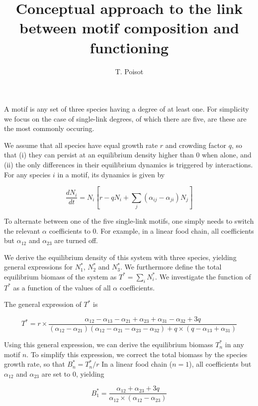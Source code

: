 \documentclass[11pt]{article}
\title{Conceptual approach to the link between motif composition and functioning}
\author{T. Poisot}
\begin{document}
	
	\maketitle

	A motif is any set of three species having a degree of at least one. For
	simplicity we focus on the case of single-link degrees, of which there are
	five, are these are the most commonly occuring.

	We assume that all species have equal growth rate $r$ and crowding factor
	$q$, so that (i) they can persist at an equilibrium density higher than 0
	when alone, and (ii) the only differences in their equilibrium dynamics is
	triggered by interactions. For any species $i$ in a motif, its dynamics is
	given by

	\begin{equation}
		\frac{dN_i}{dt} = N_i\left[r-qN_i+\sum_j\left(\alpha_{ij}-\alpha_{ji}\right)N_j\right]
	\end{equation}

	To alternate between one of the five single-link motifs, one simply needs
	to switch the relevant $\alpha$ coefficients to 0. For example, in a
	linear food chain, all coefficients but $\alpha_{12}$ and $\alpha_{23}$
	are turned off.

	We derive the equilibrium density of this system with three species,
	yielding general expressions for $N_1^*$, $N_2^*$ and $N_3^*$. We furthermore
	define the total equilibrium biomass of the system as $T^* = \sum_iN_i^*$.
	We investigate the function of $T^*$ as a function of the values of all
	$\alpha$ coefficients.

	The general expression of $T^*$ is

	\begin{equation}
		T^* = r\times\frac{\alpha_{12}-\alpha_{13}-\alpha_{21}+\alpha_{23}+\alpha_{31}-\alpha_{32}+3q}{(\alpha_{12}-\alpha_{21})(\alpha_{12}-\alpha_{21}-\alpha_{23}-\alpha_{32})+q\times(q-\alpha_{13}+\alpha_{31})}
	\end{equation}

	Using this general expression, we can derive the equilibrium biomass
	$T_n^*$ in any motif $n$. To simplify this expression, we correct the
	total biomass by the species growth rate, so that $B_n^* = T_n^*/r$ In a
	linear food chain ($n=1$), all coefficients but $\alpha_{12}$ and
	$\alpha_{23}$ are set to 0, yielding

	\begin{equation}
		B_1^* = \frac{\alpha_{12}+\alpha_{23}+3q}{\alpha_{12}\times(\alpha_{12}-\alpha_{23})}
	\end{equation}
\end{document}
